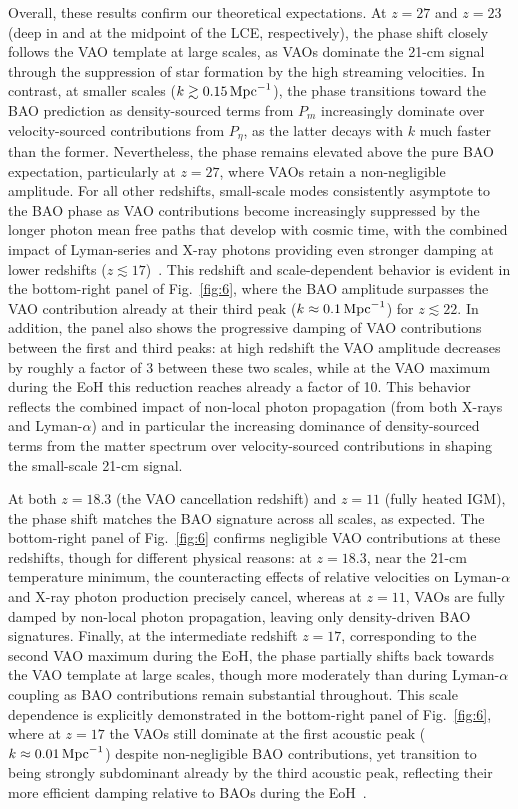 \documentclass[floats,floatfix,showpacs,amssymb,prd,twocolumn,superscriptaddress,nofootinbib,reprint,preprintnumbers]{revtex4-2}
\begin{document}
Overall, these results confirm our theoretical expectations. At $z=27$ and $z=23$ (deep in and at the midpoint of the LCE, respectively), the phase shift closely follows the VAO template at large scales, as VAOs dominate the 21-cm signal through the suppression of star formation by the high streaming velocities. In contrast, at smaller scales ($k\gtrsim 0.15\,\rm{Mpc}^{-1}$), the phase transitions toward the BAO prediction as density-sourced terms from $P_m$ increasingly dominate over velocity-sourced contributions from $P_\eta$, as the latter decays with $k$ much faster than the former. Nevertheless, the phase remains elevated above the pure BAO expectation, particularly at $z=27$, where VAOs retain a non-negligible amplitude. For all other redshifts, small-scale modes consistently asymptote to the BAO phase as VAO contributions become increasingly suppressed by the longer photon mean free paths that develop with cosmic time, with the combined impact of Lyman-series and X-ray photons providing even stronger damping at lower redshifts ($z\lesssim 17$)~\cite{cruz24,cruz25}. This redshift and scale-dependent behavior is evident in the bottom-right panel of Fig.~\ref{fig:6}, where the BAO amplitude surpasses the VAO contribution already at their third peak ($k\approx 0.1\,\rm{Mpc}^{-1}$) for $z\lesssim 22$. In addition, the panel also shows the progressive damping of VAO contributions between the first and third peaks: at high redshift the VAO amplitude decreases by roughly a factor of 3 between these two scales, while at the VAO maximum during the EoH this reduction reaches already a factor of 10. This behavior reflects the combined impact of non-local photon propagation (from both X-rays and Lyman-$\alpha$) and in particular the increasing dominance of density-sourced terms from the matter spectrum over velocity-sourced contributions in shaping the small-scale 21-cm signal.

At both $z=18.3$ (the VAO cancellation redshift) and $z=11$ (fully heated IGM), the phase shift matches the BAO signature across all scales, as expected. The bottom-right panel of Fig.~\ref{fig:6} confirms negligible VAO contributions at these redshifts, though for different physical reasons: at $z=18.3$, near the 21-cm temperature minimum, the counteracting effects of relative velocities on Lyman-$\alpha$ and X-ray photon production precisely cancel, whereas at $z=11$, VAOs are fully damped by non-local photon propagation, leaving only density-driven BAO signatures. Finally, at the intermediate redshift $z=17$, corresponding to the second VAO maximum during the EoH, the phase partially shifts back towards the VAO template at large scales, though more moderately than during Lyman-$\alpha$ coupling as BAO contributions remain substantial  throughout. This scale dependence is explicitly demonstrated in the bottom-right panel of Fig.~\ref{fig:6}, where at $z=17$ the VAOs still dominate at the first acoustic peak ($k\approx 0.01\,\rm{Mpc}^{-1}$) despite non-negligible BAO contributions, yet transition to being strongly subdominant already by the third acoustic peak, reflecting their more efficient damping relative to BAOs during the EoH~\cite{cruz24,cruz25}. 
\end{document}
